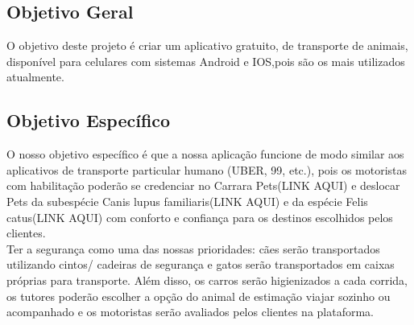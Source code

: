 \subsection{Objetivo Geral}
O objetivo deste projeto é criar um aplicativo gratuito, de transporte de animais, disponível para celulares  com sistemas Android e IOS,pois são os mais utilizados atualmente.\\

\subsection{Objetivo Específico}
O nosso objetivo específico é que a nossa aplicação funcione de modo similar aos aplicativos de transporte particular humano (UBER, 99, etc.), pois os motoristas com habilitação poderão se credenciar no Carrara Pets(LINK AQUI) e deslocar Pets da subespécie Canis lupus familiaris(LINK AQUI) e da espécie Felis catus(LINK AQUI) com conforto e confiança para os destinos escolhidos pelos clientes.\\
Ter a segurança como uma das nossas prioridades: cães serão transportados utilizando cintos/ cadeiras de segurança e gatos serão transportados em caixas próprias para transporte. Além disso, os carros serão higienizados a cada corrida, os tutores poderão escolher a opção do animal de estimação viajar sozinho ou acompanhado e os motoristas serão avaliados pelos clientes na plataforma.\\


